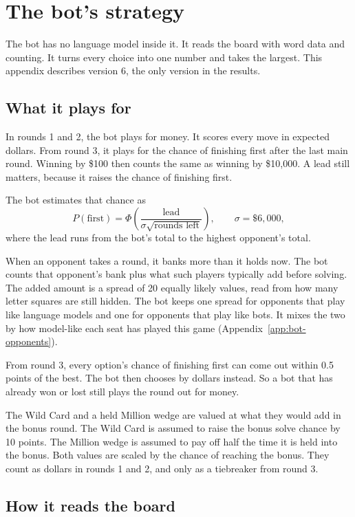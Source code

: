 \section{The bot's strategy}\label{app:bot}

The bot has no language model inside it. It reads the board with word data and counting. It turns every choice into one number and takes the largest. This appendix describes version 6, the only version in the results.

\subsection{What it plays for}

In rounds 1 and 2, the bot plays for money. It scores every move in expected dollars. From round 3, it plays for the chance of finishing first after the last main round. Winning by \$100 then counts the same as winning by \$10,000. A lead still matters, because it raises the chance of finishing first.

The bot estimates that chance as
\[
  P(\text{first}) = \Phi\!\left(\frac{\text{lead}}{\sigma\sqrt{\text{rounds left}}}\right), \qquad \sigma = \$6{,}000,
\]
where the lead runs from the bot's total to the highest opponent's total.

When an opponent takes a round, it banks more than it holds now. The bot counts that opponent's bank plus what such players typically add before solving. The added amount is a spread of 20 equally likely values, read from how many letter squares are still hidden. The bot keeps one spread for opponents that play like language models and one for opponents that play like bots. It mixes the two by how model-like each seat has played this game (Appendix~\ref{app:bot-opponents}).

From round 3, every option's chance of finishing first can come out within 0.5 points of the best. The bot then chooses by dollars instead. So a bot that has already won or lost still plays the round out for money.

The Wild Card and a held Million wedge are valued at what they would add in the bonus round. The Wild Card is assumed to raise the bonus solve chance by 10 points. The Million wedge is assumed to pay off half the time it is held into the bonus. Both values are scaled by the chance of reaching the bonus. They count as dollars in rounds 1 and 2, and only as a tiebreaker from round 3.

\subsection{How it reads the board}

